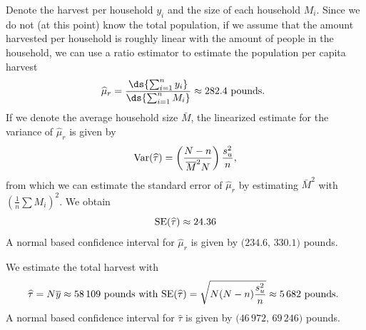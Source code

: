 \documentclass[usenames,dvipsnames]{homework}
\begin{document}
\begin{solution}
 Denote the harvest per household $y_i$ and the size of each household $M_i$.  Since we do not (at this point) know the total population, if we assume that the amount harvested per household is roughly linear with the amount of people in the household, we can use a ratio estimator to estimate the population per capita harvest
$$
  \hat\mu_r = \frac{\ds{\sum_{i=1}^n y_i}}{\ds{\sum_{i=1}^n M_i}} \approx 282.4 \text{ pounds. }
$$ 
  If we denote the average household size $\bar M$, the linearized estimate for the variance of $\hat\mu_r$ is given by
  $$
    \mathrm{Var}(\widehat\tau) =  \left(\frac {N-n}{\overline M^2N}\right) \frac{s_u^2}{n},
  $$
  from which we can estimate the standard error of $\hat\mu_r$ by estimating $\bar M^2$ with $(\frac 1n\sum M_i)^2$. We obtain
  $$
    \mathrm{SE}(\widehat\tau)\approx 24.36
  $$
  A normal based confidence interval for $\hat\mu_r$ is given by $\big(234.6,\,330.1\big)$ pounds.
  
\end{solution}

\begin{solution}
  We estimate the total harvest with
  $$
    \widehat\tau = N\overline y \approx 58\,109 \text{ pounds with } \mathrm{SE}(\widehat\tau) =  \sqrt{N(N-n) \frac{s_u^2}n} \approx 5\,682 \text{ pounds. }
  $$
  A normal based confidence interval for $\hat\tau$ is given by $\big(46\,972,\,69\,246\big)$ pounds.
\end{solution}
\end{document}
